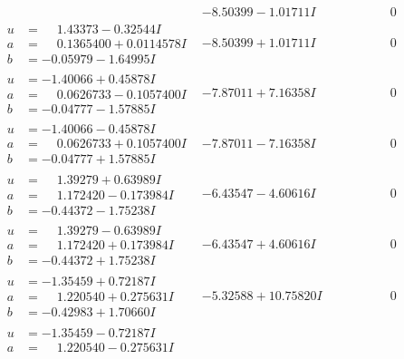 \documentclass[1p]{elsarticle_modified}
\theoremstyle{definition}
\begin{document}
$$\begin{array}{c|c|c}
 & -8.50399 - 1.01711 I & \phantom{-0.000000 } 0 \\ \hline\begin{aligned}
u &= \phantom{-}1.43373 - 0.32544 I \\
a &= \phantom{-}0.1365400 + 0.0114578 I \\
b &= -0.05979 - 1.64995 I\end{aligned}
 & -8.50399 + 1.01711 I & \phantom{-0.000000 } 0 \\ \hline\begin{aligned}
u &= -1.40066 + 0.45878 I \\
a &= \phantom{-}0.0626733 - 0.1057400 I \\
b &= -0.04777 - 1.57885 I\end{aligned}
 & -7.87011 + 7.16358 I & \phantom{-0.000000 } 0 \\ \hline\begin{aligned}
u &= -1.40066 - 0.45878 I \\
a &= \phantom{-}0.0626733 + 0.1057400 I \\
b &= -0.04777 + 1.57885 I\end{aligned}
 & -7.87011 - 7.16358 I & \phantom{-0.000000 } 0 \\ \hline\begin{aligned}
u &= \phantom{-}1.39279 + 0.63989 I \\
a &= \phantom{-}1.172420 - 0.173984 I \\
b &= -0.44372 - 1.75238 I\end{aligned}
 & -6.43547 - 4.60616 I & \phantom{-0.000000 } 0 \\ \hline\begin{aligned}
u &= \phantom{-}1.39279 - 0.63989 I \\
a &= \phantom{-}1.172420 + 0.173984 I \\
b &= -0.44372 + 1.75238 I\end{aligned}
 & -6.43547 + 4.60616 I & \phantom{-0.000000 } 0 \\ \hline\begin{aligned}
u &= -1.35459 + 0.72187 I \\
a &= \phantom{-}1.220540 + 0.275631 I \\
b &= -0.42983 + 1.70660 I\end{aligned}
 & -5.32588 + 10.75820 I & \phantom{-0.000000 } 0 \\ \hline\begin{aligned}
u &= -1.35459 - 0.72187 I \\
a &= \phantom{-}1.220540 - 0.275631 I \\

\end{aligned}
\end{array}$$
\end{document}
